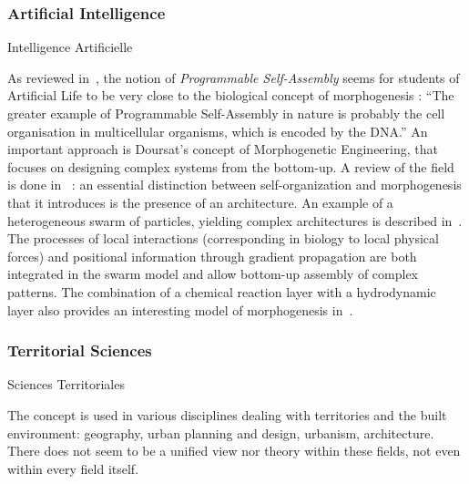 





\subsubsection*{Artificial Intelligence}{Intelligence Artificielle}


As reviewed in~\cite{crosato2014self}, the notion of \emph{Programmable Self-Assembly} seems for students of Artificial Life to be very close to the biological concept of morphogenesis : ``The greater example of Programmable Self-Assembly in nature is probably the cell organisation in multicellular organisms, which is encoded by the DNA.'' An important approach is Doursat's concept of Morphogenetic Engineering, that focuses on designing complex systems from the bottom-up. A review of the field is done in~\cite{doursat2013review} : an essential distinction between self-organization and morphogenesis that it introduces is the presence of an architecture. An example of a heterogeneous swarm of particles, yielding complex architectures is described in~\cite{doursat2008programmable}. The processes of local interactions (corresponding in biology to local physical forces) and positional information through gradient propagation are both integrated in the swarm model and allow  bottom-up assembly of complex patterns. The combination of a chemical reaction layer with a hydrodynamic layer also provides an interesting model of morphogenesis in~\cite{cussat2012synthesis}.




\subsubsection*{Territorial Sciences}{Sciences Territoriales}


The concept is used in various disciplines dealing with territories and the built environment: geography, urban planning and design, urbanism, architecture. There does not seem to be a unified view nor theory within these fields, not even within every field itself.

